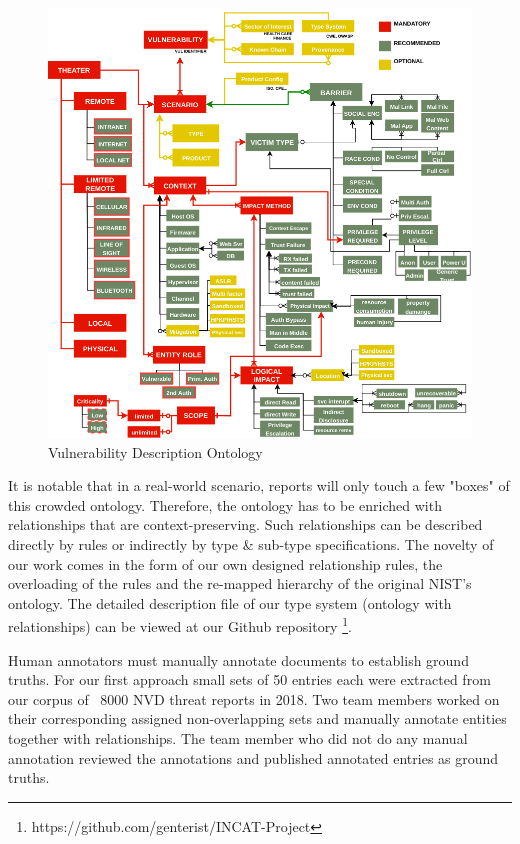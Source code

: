 \documentclass{article} %
\begin{document}
\begin{figure}[h]
  \centering
  \includegraphics[width=12cm]{images/NISTIR8138.png}
  \caption{Vulnerability Description Ontology}
  \label{Figure:VulOntology}
\end{figure}

It is notable that in a real-world scenario, reports will only touch a few "boxes" of this crowded ontology. Therefore, the ontology has to be enriched with relationships that are context-preserving. Such relationships can be described directly by rules or indirectly by type \& sub-type specifications. The novelty of our work comes in the form of our own designed relationship rules, the overloading of the rules and the re-mapped hierarchy of the original NIST's ontology. The detailed description file of our type system (ontology with relationships) can be viewed at our Github repository \footnote{https://github.com/genterist/INCAT-Project}.

Human annotators must manually annotate documents to establish ground truths.  For our first approach small sets of 50 entries each were extracted from our corpus of ~8000 NVD threat reports in 2018.  Two team members worked on their corresponding assigned non-overlapping sets and manually annotate entities together with relationships. The team member who did not do any manual annotation reviewed the annotations and published annotated entries as ground truths.  
\end{document}
